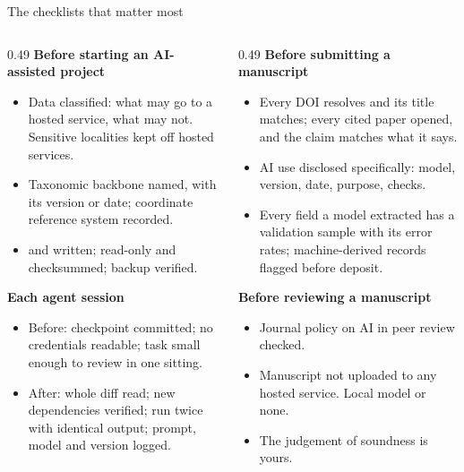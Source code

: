 \documentclass[11pt,aspectratio=169]{beamer}
\begin{document}
\begin{frame}{The checklists that matter most}
  \footnotesize
  \begin{columns}[T]
    \begin{column}{0.49\textwidth}
      \textbf{Before starting an AI-assisted project}
      \begin{itemize}
        \item[$\square$] Data classified: what may go to a hosted service,
          what may not. Sensitive localities kept off hosted services.
        \item[$\square$] Taxonomic backbone named, with its version or date;
          coordinate reference system recorded.
        \item[$\square$]  and  written;
           read-only and checksummed; backup verified.
      \end{itemize}
      \textbf{Each agent session}
      \begin{itemize}
        \item[$\square$] Before: checkpoint committed; no credentials
          readable; task small enough to review in one sitting.
        \item[$\square$] After: whole diff read; new dependencies verified;
          run twice with identical output; prompt, model and version logged.
      \end{itemize}
    \end{column}
    \begin{column}{0.49\textwidth}
      \textbf{Before submitting a manuscript}
      \begin{itemize}
        \item[$\square$] Every DOI resolves and its title matches; every cited
          paper opened, and the claim matches what it says.
        \item[$\square$] AI use disclosed specifically: model, version, date,
          purpose, checks.
        \item[$\square$] Every field a model extracted has a validation sample
          with its error rates; machine-derived records flagged before
          deposit.
      \end{itemize}
      \textbf{Before reviewing a manuscript}
      \begin{itemize}
        \item[$\square$] Journal policy on AI in peer review checked.
        \item[$\square$] Manuscript not uploaded to any hosted service. Local
          model or none.
        \item[$\square$] The judgement of soundness is yours.
      \end{itemize}
    \end{column}
  \end{columns}
\end{frame}
\end{document}
